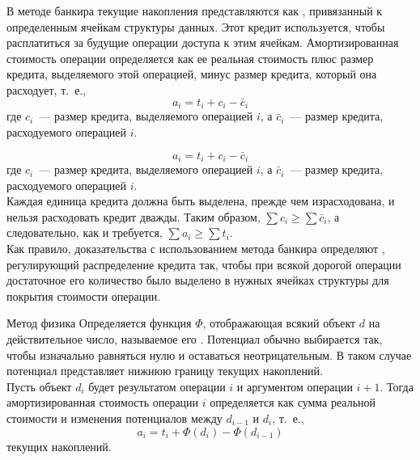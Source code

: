 \begin{frame}[fragile]{}
 В методе банкира
текущие накопления представляются как ,
привязанный к определенным ячейкам структуры данных. Этот кредит
используется, чтобы расплатиться за будущие операции доступа к этим
ячейкам.  Амортизированная стоимость операции определяется как ее
реальная стоимость плюс размер кредита, выделяемого этой операцией,
минус размер кредита, который она расходует, т.~е.,
$$
a_i = t_i + c_i - \bar{c}_i
$$
где $c_i$~--- размер кредита, выделяемого операцией $i$, а $\bar{c}_i$~---
размер кредита, расходуемого операцией $i$.


\end{frame}

\begin{frame}[fragile]{}
$$
a_i = t_i + c_i - \bar{c}_i
$$
где $c_i$~--- размер кредита, выделяемого операцией $i$, а $\bar{c}_i$~---
размер кредита, расходуемого операцией $i$.\\

 Каждая единица кредита
должна быть выделена, прежде чем израсходована, и нельзя расходовать
кредит дважды. Таким образом, $\sum c_i \ge \sum \bar{c}_i$, а
следовательно, как и требуется, $\sum a_i \ge \sum t_i$.\\

Как правило,
доказательства с использованием метода банкира определяют
, регулирующий распределение
кредита так, чтобы при всякой дорогой операции достаточное его
количество было выделено в нужных ячейках структуры для покрытия
стоимости операции.
\end{frame}

\begin{frame}[fragile]{Метод физика}
Определяется функция $\Phi$, отображающая всякий
объект $d$ на действительное число, называемое его
.  Потенциал обычно выбирается так, чтобы
изначально равняться нулю и оставаться неотрицательным. В таком случае
потенциал представляет нижнюю границу  текущих накоплений.\\

Пусть объект $d_i$ будет результатом операции $i$ и аргументом
операции $i+1$. Тогда амортизированная стоимость операции $i$
определяется как сумма реальной стоимости и изменения потенциалов между
$d_{i-1}$ и $d_i$, т.~е.,
$$
a_i = t_i + \Phi(d_i) - \Phi(d_{i-1})
$$
текущих накоплений.


\end{frame}


